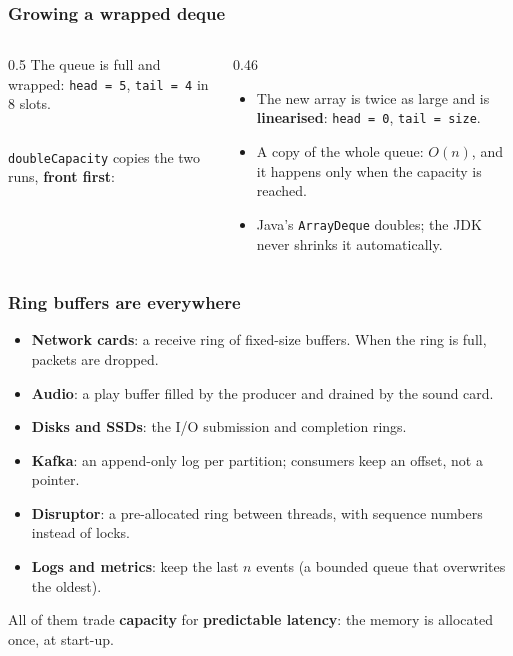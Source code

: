 \documentclass[aspectratio=169,10pt,compress]{beamer}
\begin{document}
\begin{frame}[t,fragile] \frametitle{Growing a wrapped deque}
  \begin{columns}[T]
    \begin{column}{0.5\textwidth}
      \small The queue is full and wrapped: \texttt{head = 5}, \texttt{tail = 4} in 8 slots.\\[0.3em]
      \\[0.3em]
      \texttt{doubleCapacity} copies the two runs, \textbf{front first}:\\[0.2em]
    \end{column}
    \begin{column}{0.46\textwidth}
      \begin{itemize}\small
        \item The new array is twice as large and is \textbf{linearised}: \texttt{head = 0}, \texttt{tail = size}.
        \item A copy of the whole queue: $O(n)$, and it happens only when the capacity is reached.
        \item Java's \texttt{ArrayDeque} doubles; the JDK never shrinks it automatically.
      \end{itemize}
    \end{column}
  \end{columns}
\end{frame}




\begin{frame}[t,fragile] \frametitle{Ring buffers are everywhere}
  \begin{itemize}
    \item \textbf{Network cards}: a receive ring of fixed-size buffers. When the ring is full, packets are dropped.
    \item \textbf{Audio}: a play buffer filled by the producer and drained by the sound card.
    \item \textbf{Disks and SSDs}: the I/O submission and completion rings.
    \item \textbf{Kafka}: an append-only log per partition; consumers keep an offset, not a pointer.
    \item \textbf{Disruptor}: a pre-allocated ring between threads, with sequence numbers instead of locks.
    \item \textbf{Logs and metrics}: keep the last $n$ events (a bounded queue that overwrites the oldest).
  \end{itemize}
  \vspace{0.5em}
  \small All of them trade \textbf{capacity} for \textbf{predictable latency}: the memory is allocated once, at start-up.
\end{frame}
\end{document}
